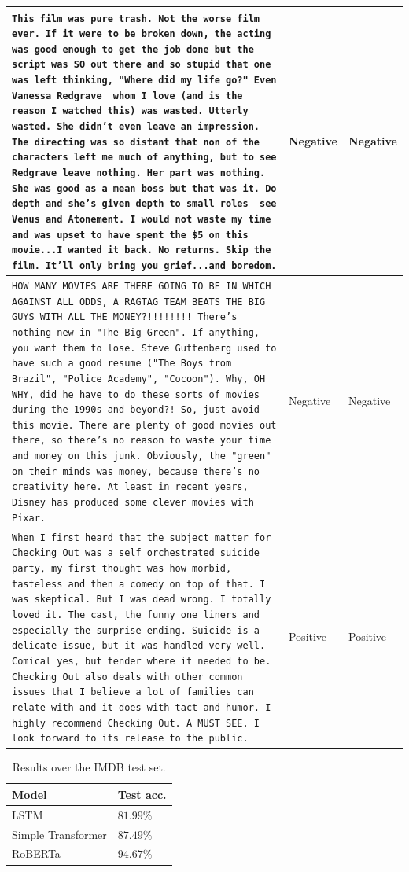 \begin{table}[h]
\begin{tabularx}{\textwidth}{Xll}
{\scriptsize \texttt{This film was pure trash. Not the worse film ever.
If it were to be broken down, the acting was good
enough to get the job done but the script was SO
out there and so stupid that one was left
thinking, "Where did my life go?" Even Vanessa
Redgrave~ whom I love (and is the reason I watched
this) was wasted. Utterly wasted. She didn't even
leave an impression. The directing was so distant
that non of the characters left me much of
anything, but to see Redgrave leave nothing. Her
part was nothing. She was good as a mean boss but
that was it. Do depth and she's given depth to
small roles~ see Venus and Atonement. I would not
waste my time and was upset to have spent the \$5
on this movie...I wanted it back. No returns. Skip
the film. It'll only bring you grief...and
boredom.} } & Negative & Negative \\
\hline
 {\scriptsize \texttt{HOW MANY MOVIES ARE THERE GOING TO BE IN WHICH
AGAINST ALL ODDS, A RAGTAG TEAM BEATS THE BIG GUYS
WITH ALL THE MONEY?!!!!!!!! There's nothing new in
"The Big Green". If anything, you want them to
lose. Steve Guttenberg used to have such a good
resume ("The Boys from Brazil", "Police Academy",
"Cocoon"). Why, OH WHY, did he have to do these
sorts of movies during the 1990s and beyond?! So,
just avoid this movie. There are plenty of good
movies out there, so there's no reason to waste
your time and money on this junk. Obviously, the
"green" on their minds was money, because there's
no creativity here. At least in recent years,
Disney has produced some clever movies with Pixar.} } &   Negative & Negative   \\
\hline
 {\scriptsize \texttt{When I first heard that the subject matter for
Checking Out was a self orchestrated suicide
party, my first thought was how morbid, tasteless
and then a comedy on top of that. I was skeptical.
But I was dead wrong. I totally loved it. The
cast, the funny one liners and especially the
surprise ending. Suicide is a delicate issue, but
it was handled very well. Comical yes, but tender
where it needed to be. Checking Out also deals
with other common issues that I believe a lot of
families can relate with and it does with tact and
humor. I highly recommend Checking Out. A MUST
SEE. I look forward to its release to the public.} } &   Positive & Positive   \\

\end{tabularx}
\label{tab:examples}
\end{table}

\begin{table}[h]
\caption{Results over the IMDB test set.}
\centering
\begin{tabular}{ll}
Model & Test acc. \\
\hline
LSTM &  $81.99\%$ \\
Simple Transformer &  $87.49\%$ \\
RoBERTa &  $94.67\%$\\
\end{tabular}
\label{tab:nlp}
\end{table}




